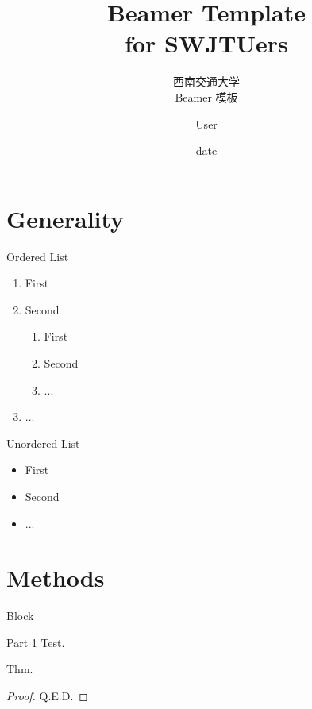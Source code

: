 \documentclass[11pt]{SWJTUBeamer}
\title[SWJTU Beamer Template]{Beamer Template\\for SWJTUers}
\subtitle{西南交通大学\\Beamer 模板}
\author[User]{User}%
\institute[School]{School}%
\date{date} %
\begin{document}
\begin{frame}
    \maketitle
\end{frame}

\section{Generality}

\begin{frame}{Ordered List}
    \begin{enumerate}
        \item First
        \item Second
              \begin{enumerate}
                  \item First
                  \item Second
                  \item ...
              \end{enumerate}
        \item ...
    \end{enumerate}
\end{frame}

\begin{frame}{Unordered List}
    \begin{itemize}
        \item First
        \item Second
        \item ...
    \end{itemize}
\end{frame}

\section{Methods}

\begin{frame}{Block}
    \begin{block}{Part 1}
        Test.
    \end{block}
    \begin{theorem}[Thm 1]
        Thm.
    \end{theorem}
    \begin{proof}
        Q.E.D.
    \end{proof}
\end{frame}
\end{document}
